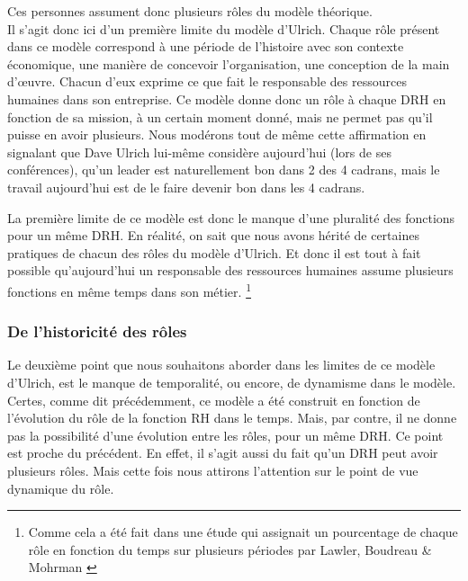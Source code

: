 
Ces personnes assument donc plusieurs rôles du modèle théorique. \\

Il s'agit donc ici d'un première limite du modèle d'Ulrich. Chaque rôle présent dans ce modèle correspond à une période de l'histoire avec son contexte économique, une manière de concevoir l'organisation, une conception de la main d'\oe{}uvre. Chacun d'eux exprime ce que fait le responsable des ressources humaines dans son entreprise. Ce modèle donne donc un rôle à chaque DRH en fonction de sa mission, à un certain moment donné, mais ne permet pas qu'il puisse en avoir plusieurs. Nous modérons tout de même cette affirmation en signalant que Dave Ulrich lui-même considère aujourd'hui (lors de ses conférences), qu'un leader est naturellement bon dans 2 des 4 cadrans, mais le travail aujourd'hui est de le faire devenir bon dans les 4 cadrans. \cite{capitalhumain}\newline 

La première limite de ce modèle est donc le manque d'une pluralité des fonctions pour un même DRH. En réalité, on sait que nous avons hérité de certaines pratiques de chacun des rôles du modèle d'Ulrich. Et donc il est tout à fait possible qu'aujourd'hui un responsable des ressources humaines assume plusieurs fonctions en même temps dans son métier. \footnote{Comme cela a été fait dans une étude qui assignait un pourcentage de chaque rôle en fonction du temps sur plusieurs périodes par Lawler, Boudreau \& Mohrman \cite{Lawler2006}}\\


\subsubsection{De l'historicité des rôles}

Le deuxième point que nous souhaitons aborder dans les limites de ce modèle d'Ulrich, est le manque de temporalité, ou encore, de dynamisme dans le modèle. Certes, comme dit précédemment, ce modèle a été construit en fonction de l'évolution du rôle de la fonction RH dans le temps. Mais, par contre, il ne donne pas la possibilité d'une évolution entre les rôles, pour un même DRH. Ce point est proche du précédent. En effet, il s'agit aussi du fait qu'un DRH peut avoir plusieurs rôles. Mais cette fois nous attirons l'attention sur le point de vue dynamique du rôle. \\

